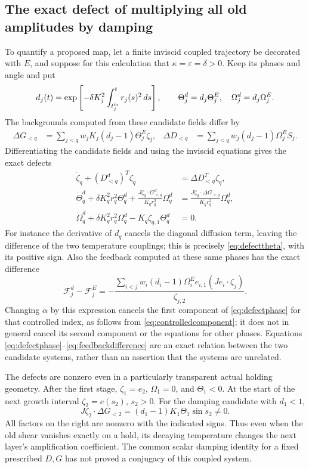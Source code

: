 \subsection{The exact defect of multiplying all old amplitudes by damping}
To quantify a proposed map, let a finite inviscid coupled trajectory
be decorated with $E$, and suppose for this calculation that
$\kappa=\varepsilon=\delta>0$. Keep its phases and angle and put
\[
 d_j(t)=\exp\left[-\delta K_j^2
 \int_{t_j^{\rm in}}^t r_j(s)^2\,ds\right],\qquad
 \Theta_j^d=d_j\Theta_j^E,\quad\Omega_j^d=d_j\Omega_j^E.
\]
The backgrounds computed from these candidate fields differ by
\begin{align}
 \Delta G_{<q}&=\sum_{j<q}w_jK_j(d_j-1)\Theta_j^E\zeta_j,
 &\Delta D_{<q}&=\sum_{j<q}w_j(d_j-1)\Omega_j^ES_j.
 \label{eq:dampingdefectbackground}
\end{align}
Differentiating the candidate fields and using the inviscid
equations gives the exact defects
\begin{align}
 \dot\zeta_q+(D^d_{<q})^T\zeta_q
 &=\Delta D_{<q}^T\zeta_q,\label{eq:defectphase}\\
 \dot\Theta_q^d+\delta K_q^2r_q^2\Theta_q^d
 +\frac{J\zeta_q\cdot G^d_{<q}}{K_qr_q^2}\Omega_q^d
 &=\frac{J\zeta_q\cdot\Delta G_{<q}}{K_qr_q^2}\Omega_q^d,
 \label{eq:defecttheta}\\
 \dot\Omega_q^d+\delta K_q^2r_q^2\Omega_q^d
 -K_q\zeta_{q,1}\Theta_q^d&=0.\label{eq:defectomega}
\end{align}
For instance the derivative of $d_q$ cancels the diagonal
diffusion term, leaving the difference of the two temperature
couplings; this is precisely \eqref{eq:defecttheta}, with its
positive sign. Also the feedback computed at these same phases
has the exact difference
\begin{equation}
 \mathcal F_j^d-\mathcal F_j^E
 =-\frac{\sum_{i<j}w_i(d_i-1)\Omega_i^Ee_{i,1}
 (Je_i\cdot\zeta_j)}{\zeta_{j,2}}.
 \label{eq:feedbackdifference}
\end{equation}
Changing $\dot\alpha$ by this expression cancels the first
component of \eqref{eq:defectphase} for that controlled index,
as follows from \eqref{eq:controlledcomponent}; it does not in
general cancel its second component or the equations for other
phases. Equations \eqref{eq:defectphase}--\eqref{eq:feedbackdifference}
are an exact relation between the two candidate systems, rather
than an assertion that the systems are unrelated.

The defects are nonzero even in a particularly transparent
actual holding geometry. After the first stage,
$\zeta_1=e_2$, $\Omega_1=0$, and $\Theta_1<0$. At the start
of the next growth interval $\zeta_2=e(s_2)$, $s_2>0$.
For the damping candidate with $d_1<1$,
\[
 J\zeta_2\cdot\Delta G_{<2}
 =(d_1-1)K_1\Theta_1\sin s_2\ne0.
\]
All factors on the right are nonzero with the indicated signs.
Thus even when the old shear vanishes exactly on a hold, its
decaying temperature changes the next layer's amplification
coefficient. The common scalar damping identity for a fixed
prescribed $D,G$ has not proved a conjugacy of this coupled system.

